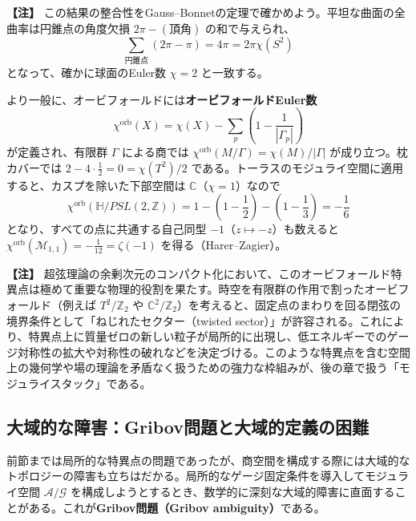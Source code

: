 \documentclass[uplatex, dvipdfmx, book]{jsbook}
\let\origsubsection\subsection
\let\origsubsubsection\subsubsection
\renewcommand{\section}{\origsubsection}
\renewcommand{\subsection}{\origsubsubsection}
\renewcommand{\subsubsection}{\paragraph}
\newenvironment{note}{\vspace{1ex}\par\footnotesize\noindent\textbf{【注】}}{\par\vspace{1ex}}
\begin{document}
\begin{note}
この結果の整合性をGauss--Bonnetの定理で確かめよう。平坦な曲面の全曲率は円錐点の角度欠損 $2\pi - (\text{頂角})$ の和で与えられ、
\begin{equation*}
    \sum_{\text{円錐点}} (2\pi - \pi) = 4\pi = 2\pi \chi(S^2)
\end{equation*}
となって、確かに球面のEuler数 $\chi = 2$ と一致する。

より一般に、オービフォールドには\textbf{オービフォールドEuler数}
\begin{equation*}
    \chi^{\mathrm{orb}}(X) = \chi(X) - \sum_{p} \left( 1 - \frac{1}{|\Gamma_p|} \right)
\end{equation*}
が定義され、有限群 $\Gamma$ による商では $\chi^{\mathrm{orb}}(M/\Gamma) = \chi(M)/|\Gamma|$ が成り立つ。枕カバーでは $2 - 4 \cdot \frac{1}{2} = 0 = \chi(T^2)/2$ である。トーラスのモジュライ空間に適用すると、カスプを除いた下部空間は $\mathbb{C}$（$\chi = 1$）なので
\begin{equation*}
    \chi^{\mathrm{orb}}(\mathbb{H}/PSL(2,\mathbb{Z})) = 1 - \left(1 - \frac{1}{2}\right) - \left(1 - \frac{1}{3}\right) = -\frac{1}{6}
\end{equation*}
となり、すべての点に共通する自己同型 $-1$（$z \mapsto -z$）も数えると $\chi^{\mathrm{orb}}(\mathcal{M}_{1,1}) = -\frac{1}{12} = \zeta(-1)$ を得る（Harer--Zagier\cite{harerzagier1986}）。
\end{note}

\begin{note}
超弦理論の余剰次元のコンパクト化において、このオービフォールド特異点は極めて重要な物理的役割を果たす。時空を有限群の作用で割ったオービフォールド（例えば $T^2/\mathbb{Z}_2$ や $\mathbb{C}^2/\mathbb{Z}_2$）を考えると、固定点のまわりを回る閉弦の境界条件として「ねじれたセクター（twisted sector）」が許容される。これにより、特異点上に質量ゼロの新しい粒子が局所的に出現し、低エネルギーでのゲージ対称性の拡大や対称性の破れなどを決定づける。このような特異点を含む空間上の幾何学や場の理論を矛盾なく扱うための強力な枠組みが、後の章で扱う「モジュライスタック」である。
\end{note}


\section{大域的な障害：Gribov問題と大域的定義の困難}

前節までは局所的な特異点の問題であったが、商空間を構成する際には大域的なトポロジーの障害も立ちはだかる。局所的なゲージ固定条件を導入してモジュライ空間 $\mathcal{A}/\mathcal{G}$ を構成しようとするとき、数学的に深刻な大域的障害に直面することがある。これが\textbf{Gribov問題（Gribov ambiguity）}である\cite{gribov1978}。
\end{document}
